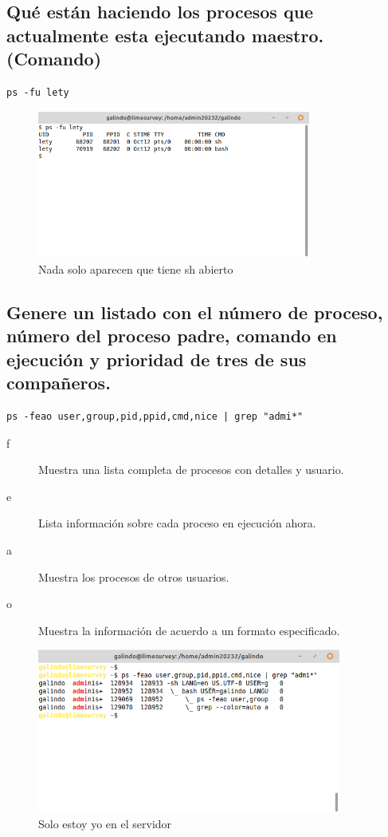 \documentclass[11pt]{article}
\begin{document}
\pagebreak

\subsection{Qué están haciendo los procesos que actualmente esta ejecutando maestro. (Comando)}
\label{sec:org1ca9ef1}
\begin{verbatim}
ps -fu lety
\end{verbatim}

\begin{figure}[htbp]
\centering
\includegraphics[width=9cm]{img/2.png}
\caption{Nada solo aparecen que tiene sh abierto}
\end{figure}

\subsection{Genere un listado con el número de proceso, número del proceso padre, comando en ejecución y prioridad de tres de sus compañeros.}
\label{sec:orgb3c0679}
\begin{verbatim}
ps -feao user,group,pid,ppid,cmd,nice | grep "admi*"
\end{verbatim}

\begin{description}
\item[{f}] Muestra una lista completa de procesos con detalles y usuario.
\item[{e}] Lista información sobre cada proceso en ejecución ahora.
\item[{a}] Muestra los procesos de otros usuarios.
\item[{o}] Muestra la información de acuerdo a un formato especificado.
\end{description}

\begin{figure}[htbp]
\centering
\includegraphics[width=10cm]{img/3.png}
\caption{Solo estoy yo en el servidor}
\end{figure}
\end{document}
